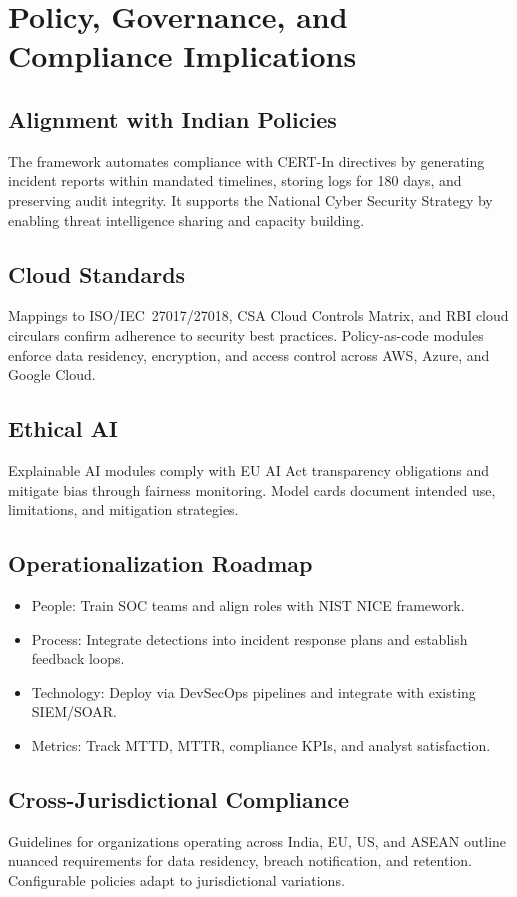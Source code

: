 \chapter{Policy, Governance, and Compliance Implications}\label{chap:policy}
\section{Alignment with Indian Policies}
The framework automates compliance with CERT-In directives by generating incident reports within mandated timelines, storing logs for 180 days, and preserving audit integrity. It supports the National Cyber Security Strategy by enabling threat intelligence sharing and capacity building.

\section{Cloud Standards}
Mappings to ISO/IEC~27017/27018, CSA Cloud Controls Matrix, and RBI cloud circulars confirm adherence to security best practices. Policy-as-code modules enforce data residency, encryption, and access control across AWS, Azure, and Google Cloud.

\section{Ethical AI}
Explainable AI modules comply with EU AI Act transparency obligations and mitigate bias through fairness monitoring. Model cards document intended use, limitations, and mitigation strategies.

\section{Operationalization Roadmap}
\begin{itemize}
    \item People: Train SOC teams and align roles with NIST NICE framework.
    \item Process: Integrate detections into incident response plans and establish feedback loops.
    \item Technology: Deploy via DevSecOps pipelines and integrate with existing SIEM/SOAR.
    \item Metrics: Track MTTD, MTTR, compliance KPIs, and analyst satisfaction.
\end{itemize}

\section{Cross-Jurisdictional Compliance}
Guidelines for organizations operating across India, EU, US, and ASEAN outline nuanced requirements for data residency, breach notification, and retention. Configurable policies adapt to jurisdictional variations.

